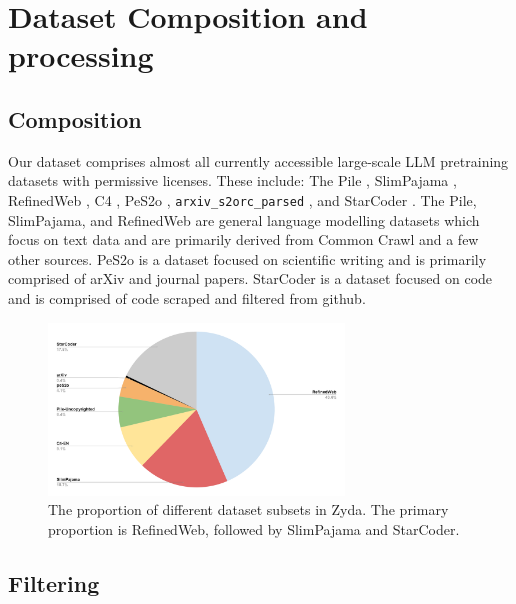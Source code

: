 \documentclass{article}
\begin{document}
\section{Dataset Composition and processing}

\subsection{Composition}
Our dataset comprises almost all currently accessible large-scale LLM pretraining datasets with permissive licenses. These include: The Pile \citep{gao2020pile}, SlimPajama \citep{slimpajama}, RefinedWeb \citep{penedo2023refinedweb}, C4 \citep{raffel2020exploring}, PeS2o \citep{peS2o}, \texttt{arxiv\_s2orc\_parsed} \citep{arxiv-s2orc-parsed}, and StarCoder \citep{li2023starcoder}. The Pile, SlimPajama, and RefinedWeb are general language modelling datasets which focus on text data and are primarily derived from Common Crawl and a few other sources. PeS2o is a dataset focused on scientific writing and is primarily comprised of arXiv and journal papers. StarCoder is a dataset focused on code and is comprised of code scraped and filtered from github.

\begin{figure}
    \centering
    \includegraphics[width=0.7\textwidth]{figures/pie_zyda.png}
    \caption{The proportion of different dataset subsets in Zyda. The primary proportion is RefinedWeb, followed by SlimPajama and StarCoder.}
    \vspace{-2ex}
    \label{fig:zyda-pie}
\end{figure}


\subsection{Filtering}
\end{document}

